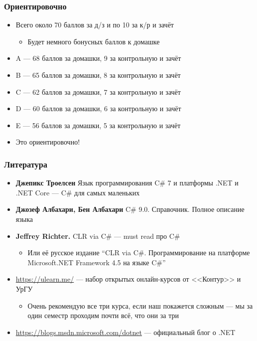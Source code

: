\documentclass{../../slides-style}
\begin{document}
    \begin{frame}
        \frametitle{Ориентировочно}
        \begin{itemize}
            \item Всего около 70 баллов за д/з и по 10 за к/р и зачёт
            \begin{itemize}
                \item Будет немного бонусных баллов к домашке
            \end{itemize}
            \item A --- 68 баллов за домашки, 9 за контрольную и зачёт
            \item B --- 65 баллов за домашки, 8 за контрольную и зачёт
            \item C --- 62 баллов за домашки, 7 за контрольную и зачёт
            \item D --- 60 баллов за домашки, 6 за контрольную и зачёт
            \item E --- 56 баллов за домашки, 5 за контрольную и зачёт
            \item Это ориентировочно!
        \end{itemize}
    \end{frame}

    \begin{frame}
    \frametitle{Литература}
        \begin{itemize}
            \item \textbf{Джепикс Троелсен} Язык программирования C\# 7 и платформы .NET и .NET Core --- C\# для самых маленьких
            \item \textbf{Джозеф Албахари, Бен Албахари} C\# 9.0. Справочник. Полное описание языка
            \item \textbf{Jeffrey Richter.} CLR via C\# --- must read про C\#
            \begin{itemize}
                \item Или её русское издание ``CLR via C\#. Программирование на платформе Microsoft.NET Framework 4.5 на языке C\#''
            \end{itemize}
            \item \url{https://ulearn.me/} --- набор открытых онлайн-курсов от <<Контур>> и УрГУ
            \begin{itemize}
                \item Очень рекомендую все три курса, если наш покажется сложным --- мы за один семестр проходим почти всё, что они за три
            \end{itemize}
            \item \url{https://blogs.msdn.microsoft.com/dotnet} --- официальный блог о .NET
        \end{itemize}
    \end{frame}
\end{document}
